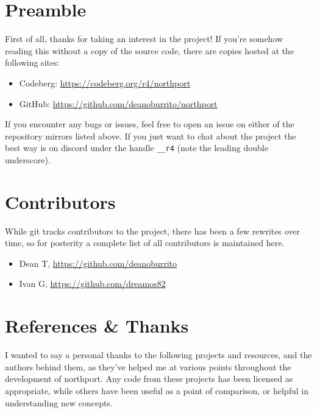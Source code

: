\section{Preamble}
First of all, thanks for taking an interest in the project! If you're somehow reading this without a copy of the source code, there are copies hosted at the following sites:

\begin{itemize}
    \item Codeberg: \url{https://codeberg.org/r4/northport}
    \item GitHub: \url{https://github.com/deanoburrito/northport}
\end{itemize}

If you encounter any bugs or issues, feel free to open an issue on either of the repository mirrors listed above. If you just want to chat about the project the best way is on discord under the handle \verb|__r4| (note the leading double underscore).

\section{Contributors}
While git tracks contributors to the project, there has been a few rewrites over time, so for posterity a complete list of all contributors is maintained here. 

\begin{itemize}
    \item Dean T, \url{https://github.com/deanoburrito}
    \item Ivan G, \url{https://github.com/dreamos82}
\end{itemize}

\section{References \& Thanks}
I wanted to say a personal thanks to the following projects and resources, and the authors behind them, as they've helped me at various points throughout the development of northport. Any code from these projects has been licensed as appropriate, while others have been useful as a point of comparison, or helpful in understanding new concepts.

